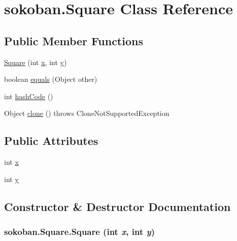 \hypertarget{classsokoban_1_1Square}{
\section{sokoban.Square Class Reference}
\label{classsokoban_1_1Square}
}
\subsection*{Public Member Functions}
\begin{CompactItemize}
\item 
\hyperlink{classsokoban_1_1Square_f60c390134d35fd61cf28102f719a1eb}{Square} (int \hyperlink{classsokoban_1_1Square_8f41c9647f12a24f565a82f52c8b05ae}{x}, int \hyperlink{classsokoban_1_1Square_8d1877d8d8008844a2eacbc33bd104ca}{y})
\item 
boolean \hyperlink{classsokoban_1_1Square_e564dcbcc5fc8f53ce582f46e52bae99}{equals} (Object other)
\item 
int \hyperlink{classsokoban_1_1Square_a8faa6bf5fc89790e7904b137848819c}{hashCode} ()
\item 
Object \hyperlink{classsokoban_1_1Square_19bf1b433cc3cddf0916801da70a0e54}{clone} ()  throws CloneNotSupportedException 	
\end{CompactItemize}
\subsection*{Public Attributes}
\begin{CompactItemize}
\item 
int \hyperlink{classsokoban_1_1Square_8f41c9647f12a24f565a82f52c8b05ae}{x}
\item 
int \hyperlink{classsokoban_1_1Square_8d1877d8d8008844a2eacbc33bd104ca}{y}
\end{CompactItemize}


\subsection{Constructor \& Destructor Documentation}
\hypertarget{classsokoban_1_1Square_f60c390134d35fd61cf28102f719a1eb}{
\subsubsection[{Square}]{\setlength{\rightskip}{0pt plus 5cm}sokoban.Square.Square (int {\em x}, \/  int {\em y})}}
\label{classsokoban_1_1Square_f60c390134d35fd61cf28102f719a1eb}




